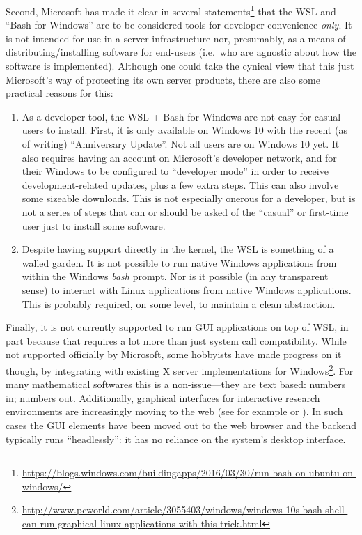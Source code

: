 \documentclass{deliverablereport}
\begin{document}
Second, Microsoft has made it clear in several
statements\footnote{\url{https://blogs.windows.com/buildingapps/2016/03/30/run-bash-on-ubuntu-on-windows/}}
that the WSL and ``Bash for Windows'' are to be considered tools for
developer convenience \emph{only}.  It is not intended for use in a
server infrastructure nor, presumably, as a means of
distributing/installing software for end-users (i.e.\ who are agnostic
about how the software is implemented).  Although one could take the
cynical view that this just Microsoft's way of protecting its own
server products, there are also some practical reasons for this:

\begin{enumerate}
\item As a developer tool, the WSL + Bash for Windows are not easy for
  casual users to install.  First, it is only available on Windows 10
  with the recent (as of writing) ``Anniversary Update''.  Not all
  users are on Windows 10 yet.  It also requires having an account on
  Microsoft's developer network, and for their Windows to be
  configured to ``developer mode'' in order to receive
  development-related updates, plus a few extra steps.  This can also
  involve some sizeable downloads.  This is not especially onerous for
  a developer, but is not a series of steps that can or should be
  asked of the ``casual'' or first-time user just to install some
  software.
\item Despite having support directly in the kernel, the WSL is
  something of a walled garden.  It is not possible to run native
  Windows applications from within the Windows \emph{bash} prompt.
  Nor is it possible (in any transparent sense) to interact with Linux
  applications from native Windows applications.  This is probably
  required, on some level, to maintain a clean abstraction.
\end{enumerate}

Finally, it is not currently supported to run GUI applications on top
of WSL, in part because that requires a lot more than just system call
compatibility.  While not supported officially by Microsoft, some
hobbyists have made progress on it though, by integrating with
existing X server implementations for
Windows\footnote{\url{http://www.pcworld.com/article/3055403/windows/windows-10s-bash-shell-can-run-graphical-linux-applications-with-this-trick.html}}.
For many mathematical softwares this is a non-issue---they are text
based: numbers in; numbers out.  Additionally, graphical interfaces
for interactive research environments are increasingly moving to the
web (see for example \Jupyter or
\href{http://opendreamkit.org/activities/2016-08-30_SMC}{\SMC}).  In
such cases the GUI elements have been moved out to the web browser and
the backend typically runs ``headlessly'': it has no reliance on the
system's desktop interface.
\end{document}
